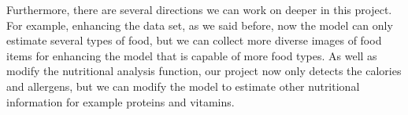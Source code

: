 \documentclass[10pt,twocolumn,letterpaper]{article}
\begin{document}
Furthermore, there are several directions we can work on deeper in this project. 
For example, enhancing the data set, as we said before, now the model can only estimate several types of food, but we can collect more diverse images of food items for enhancing the model that is capable of more food types. 
As well as modify the nutritional analysis function, our project now only detects the calories and allergens, but we can modify the model to estimate other nutritional
information for example proteins and vitamins.



{
    \small
    
    
}
\end{document}
